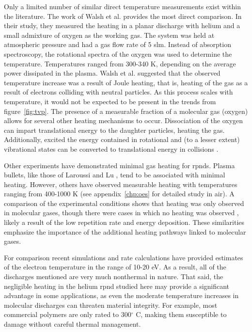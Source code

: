 Only a limited number of similar direct temperature measurements exist within
the literature. The work of Walsh et al. \cite{Walsh2010} provides the most
direct comparison. In their study, they measured the heating in a planar
discharge with helium and a small admixture of oxygen as the working gas. The
system was held at atmospheric pressure and had a gas flow rate of 5 slm.
Instead of absorption spectroscopy, the rotational spectra of the oxygen was
used to determine the temperature. Temperatures ranged from 300-340 K, depending
on the average power dissipated in the plasma. Walsh et al. suggested that the
observed temperature increase was a result of Joule heating, that is, heating of
the gas as a result of electrons colliding with neutral particles. As this
process scales with temperature, it would not be expected to be present in the
trends from figure~\ref{fig:tvp}. The presence of a measurable fraction of a
molecular gas (oxygen) allows for several other heating mechanisms to occur.
Dissociation of the oxygen can impart translational energy to the daughter
particles, heating the gas. Additionally, excited the energy contained in
rotational and (to a lesser extent) vibrational states can be converted to
translational energy in collisions \cite{Kiehlbauch2003}.

Other experiments have demonstrated minimal gas heating for \acs{rpnd}s. Plasma
bullets, like those of Laroussi and Lu \cite{Laroussi2005, Lu2006}, tend to be
associated with minimal heating. However, others have observed measurable
heating with temperatures ranging from 400-1000 K \cite{Pai2009, Popov2011,
Zuzeek2010, Aleksandrov2010} (see appendix~\ref{chp:oes} for detailed study in
air). A comparison of the experimental conditions shows that heating was only
observed in molecular gases, though there were cases in which no heating was
observed \cite{Pancheshnyi2000}, likely a result of the low repetition rate and
energy deposition. These similarities emphasize the importance of the additional
heating pathways linked to molecular gases.

For comparison recent simulations and rate calculations \cite{Takashima2011,
Aleksandrov2007} have provided estimates of the electron temperature in the
range of 10-20 eV. As a result, all of the discharges mentioned are very much
nonthermal in nature. That said, the negligible heating in the helium \acs{rpnd}
studied here may provide a significant advantage in some applications, as even
the moderate temperature increases in molecular discharges can threaten material
integrity. For example, most commercial polymers are only rated to 300$^\circ$
C, making them susceptible to damage without careful thermal management.

